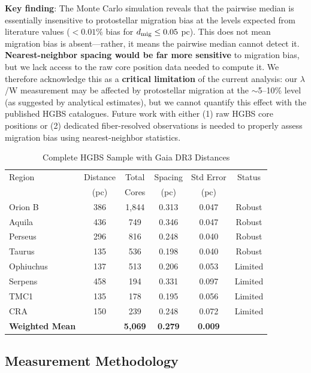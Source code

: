 \documentclass[twoside,twocolumn]{mnras}
\begin{document}
\textbf{Key finding}: The Monte Carlo simulation reveals that the pairwise median is essentially insensitive to protostellar migration bias at the levels expected from literature values ($< 0.01\%$ bias for $d_{\rm mig} \leq 0.05$ pc). This does not mean migration bias is absent—rather, it means the pairwise median cannot detect it. \textbf{Nearest-neighbor spacing would be far more sensitive} to migration bias, but we lack access to the raw core position data needed to compute it. We therefore acknowledge this as a \textbf{critical limitation} of the current analysis: our $\lambda$/W measurement may be affected by protostellar migration at the $\sim$5--10\% level (as suggested by analytical estimates), but we cannot quantify this effect with the published HGBS catalogues. Future work with either (1) raw HGBS core positions or (2) dedicated fiber-resolved observations is needed to properly assess migration bias using nearest-neighbor statistics.

\begin{table}
\caption{Complete HGBS Sample with Gaia DR3 Distances}
\label{tab:sample}
\begin{tabular}{lccccc}
\toprule
Region & Distance & Total & Spacing & Std Error & Status \\
       & (pc)   & Cores & (pc)   & (pc)      &  \\
\midrule
Orion B  & 386 & 1,844 & 0.313 & 0.047 & Robust \\
Aquila   & 436 & 749   & 0.346 & 0.047 & Robust \\
Perseus  & 296 & 816   & 0.248 & 0.040 & Robust \\
Taurus   & 135 & 536   & 0.198 & 0.040 & Robust \\
Ophiuchus& 137 & 513   & 0.206 & 0.053 & Limited \\
Serpens  & 458 & 194   & 0.331 & 0.097 & Limited \\
TMC1     & 135 & 178   & 0.195 & 0.056 & Limited \\
CRA      & 150 & 239   & 0.248 & 0.072 & Limited \\
\midrule
\textbf{Weighted Mean} &  & \textbf{5,069} & \textbf{0.279} & \textbf{0.009} &  \\
\bottomrule
\end{tabular}
\end{table}

\subsection{Measurement Methodology}
\end{document}
